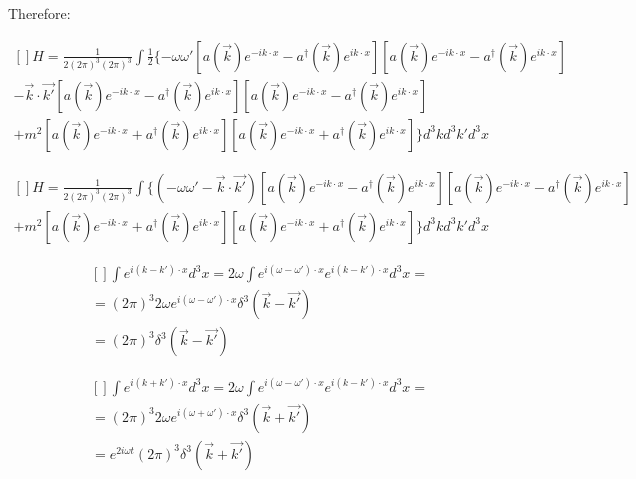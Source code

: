 \documentclass{article}
\begin{document}
    Therefore:

    \begin{equation}
        \begin{aligned}[]
            H = \frac{1}{2 (2 \pi)^3 (2 \pi)^3} \int \frac{1}{2} \{ - \omega \omega' [a(\vec{k}) e^{-i k \cdot x} - a^{\dag}(\vec{k}) e^{i k \cdot x}][a(\vec{k}) e^{-i k \cdot x} - a^{\dag}(\vec{k}) e^{i k \cdot x}] \\
            - \vec{k} \cdot \vec{k'} [a(\vec{k}) e^{-i k \cdot x} - a^{\dag}(\vec{k}) e^{i k \cdot x}][a(\vec{k}) e^{-i k \cdot x} - a^{\dag}(\vec{k}) e^{i k \cdot x}] \\
            + m^{2} [a(\vec{k}) e^{-i k \cdot x} + a^{\dag}(\vec{k}) e^{i k \cdot x}][a(\vec{k}) e^{-i k \cdot x} + a^{\dag}(\vec{k}) e^{i k \cdot x}] \}  d^{3} k d^{3} k' d^{3} x
        \end{aligned}
    \end{equation}

    \begin{equation}
        \begin{aligned}[]
            H = \frac{1}{2 (2 \pi)^3 (2 \pi)^3} \int \{ (- \omega \omega' - \vec{k} \cdot \vec{k'}) [a(\vec{k}) e^{-i k \cdot x} - a^{\dag}(\vec{k}) e^{i k \cdot x}][a(\vec{k}) e^{-i k \cdot x} - a^{\dag}(\vec{k}) e^{i k \cdot x}] \\
            + m^{2} [a(\vec{k}) e^{-i k \cdot x} + a^{\dag}(\vec{k}) e^{i k \cdot x}][a(\vec{k}) e^{-i k \cdot x} + a^{\dag}(\vec{k}) e^{i k \cdot x}] \} d^{3} k d^{3} k' d^{3} x
        \end{aligned}
    \end{equation}

    \begin{equation}
        \begin{aligned}[]
            \int e^{i (k - k') \cdot x} d^{3} x = 2 \omega \int e^{i (\omega - \omega') \cdot x} e^{i (k - k') \cdot x} d^{3} x =  \\
            = (2 \pi)^{3} 2 \omega e^{i (\omega - \omega') \cdot x} \delta^{3} (\vec{k} - \vec{k'}) \\
            = (2 \pi)^3 \delta^{3} (\vec{k} - \vec{k'})
        \end{aligned}
    \end{equation}

    \begin{equation}
        \begin{aligned}[]
            \int e^{i (k + k') \cdot x} d^{3} x = 2 \omega \int e^{i (\omega - \omega') \cdot x} e^{i (k - k') \cdot x} d^{3} x =  \\
            = (2 \pi)^{3} 2 \omega e^{i (\omega + \omega') \cdot x} \delta^{3} (\vec{k} + \vec{k'}) \\
            = e^{2 i \omega t} (2 \pi)^3 \delta^{3} (\vec{k} + \vec{k'})
        \end{aligned}
    \end{equation}
\end{document}

